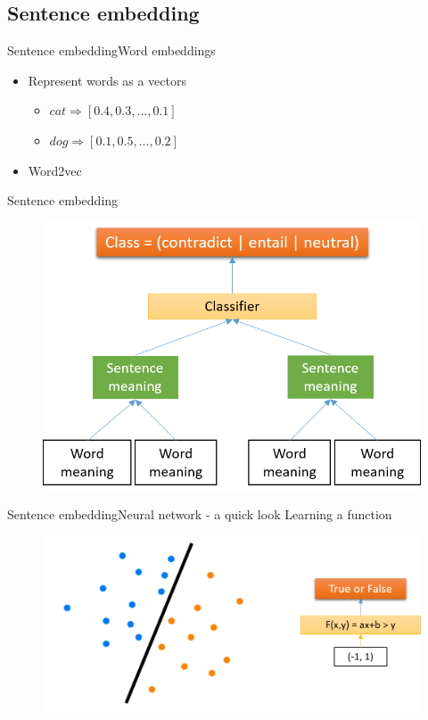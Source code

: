 \documentclass{beamer}
\begin{document}
\subsection{Sentence embedding}

\begin{frame}{Sentence embedding}{Word embeddings}
    \begin{itemize}
        \item Represent words as a vectors
            \begin{itemize}
                \item $cat \Rightarrow [0.4, 0.3,..., 0.1]$
                \item $dog \Rightarrow [0.1, 0.5,..., 0.2]$
            \end{itemize}
        \item Word2vec \cite{mikolov2013distributed}
    \end{itemize}
\end{frame}

\begin{frame}{Sentence embedding}{\cite{snli:emnlp2015}}
  \begin{figure}[h]
    \centering
    \includegraphics[scale=0.5]{neural2}
  \end{figure}
\end{frame}

\begin{frame}{Sentence embedding}{Neural network - a quick look}
    Learning a function
  \begin{figure}[h]
    \centering
    \includegraphics[scale=0.5]{neural1}
  \end{figure}
\end{frame}
\end{document}
